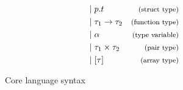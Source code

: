 \begin{figure}[htb]
\begin{align*}
\begin{aligned}
&| \; p.t                            &\footnotesize\text{(struct type)}\\
&| \; \tau_{1} \rightarrow \tau_{2}  & \footnotesize\text{(function type)}\\
&| \; \alpha                         & \footnotesize\text{(type variable)}\\
&| \; \tau_{1} \times \tau_{2}       & \footnotesize\text{(pair type)}\\
&| \; [\tau]                         & \footnotesize\text{(array type)}\\
\end{aligned}
\end{align*}
\caption{Core language syntax\label{fig:CoreSyntax}}
\end{figure}
